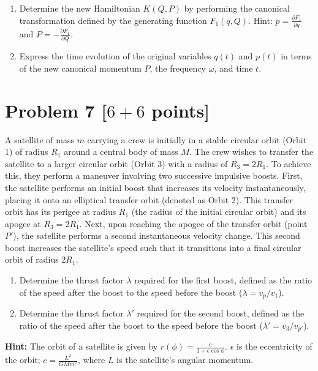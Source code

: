\documentclass[11pt, a4paper]{article} %
\begin{document}
\begin{enumerate}
    \item[(1)] Determine the new Hamiltonian $K(Q, P)$ by performing the canonical transformation defined by the generating function $F_1(q, Q)$. Hint: $p=\frac{\partial F_1}{\partial q}$ and $P=-\frac{\partial F_1}{\partial Q}$.

    \item[(2)] Express the time evolution of the original variables $q(t)$ and $p(t)$ in terms of the new canonical momentum $P$, the frequency $\omega$, and time $t$.
\end{enumerate}


\newpage
\section*{Problem 7 [$6+6$ points]}
A satellite of mass $m$ carrying a crew is initially in a stable circular orbit (Orbit 1) of radius $R_1$ around a central body of mass $M$. The crew wishes to transfer the satellite to a larger circular orbit (Orbit 3) with a radius of $R_3 = 2R_1$. To achieve this, they perform a maneuver involving two successive impulsive boosts. 
First, the satellite performs an initial boost that increases its velocity instantaneously, placing it onto an elliptical transfer orbit (denoted as Orbit 2). This transfer orbit has its perigee at radius $R_1$ (the radius of the initial circular orbit) and its apogee at $R_3 = 2R_1$.
Next, upon reaching the apogee of the transfer orbit (point $P'$), the satellite performs a second instantaneous velocity change. This second boost increases the satellite's speed such that it transitions into a final circular orbit of radius $2R_1$.
\begin{enumerate}
    \item[(1)] Determine the thrust factor $\lambda$ required for the first boost, defined as the ratio of the speed after the boost to the speed before the boost ($\lambda = v_{p} / v_1$).
    \item[(2)] Determine the thrust factor $\lambda'$ required for the second boost, defined as the ratio of the speed after the boost to the speed before the boost ($\lambda' = v_3 / v_{p'}$).
\end{enumerate}

\textbf{Hint:} The orbit of a satellite is given by $
r(\phi) = \frac{c}{1 + \epsilon \cos \phi}$. 
$\epsilon$ is the eccentricity of the orbit; $c = \frac{L^2}{GMm^2}$, where $L$ is the satellite’s angular momentum.
\end{document}
